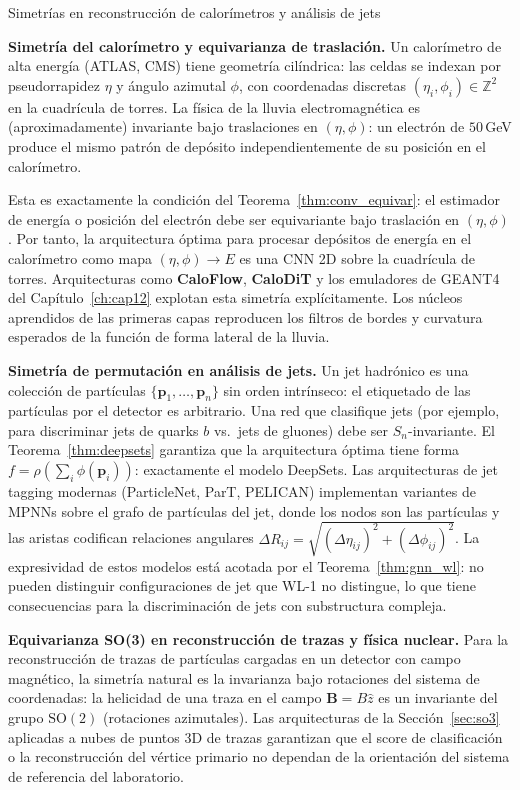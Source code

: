 \label{sec:estrella9}
\begin{estrella}{Simetrías en reconstrucción de calorímetros y análisis de jets}

\textbf{Simetría del calorímetro y equivarianza de traslación.}
Un calorímetro de alta energía (ATLAS, CMS) tiene geometría cilíndrica:
las celdas se indexan por pseudorrapidez $\eta$ y ángulo azimutal $\phi$, con
coordenadas discretas $(\eta_i, \phi_i) \in \mathbb{Z}^2$ en la cuadrícula de
torres. La física de la lluvia electromagnética es (aproximadamente) invariante
bajo traslaciones en $(\eta, \phi)$: un electrón de $50\,$GeV produce el mismo
patrón de depósito independientemente de su posición en el calorímetro.

Esta es exactamente la condición del Teorema~\ref{thm:conv_equivar}: el
estimador de energía o posición del electrón debe ser equivariante bajo
traslación en $(\eta, \phi)$. Por tanto, la arquitectura óptima para procesar
depósitos de energía en el calorímetro como mapa $(\eta, \phi) \to E$ es una
CNN 2D sobre la cuadrícula de torres. Arquitecturas como \textbf{CaloFlow},
\textbf{CaloDiT} y los emuladores de GEANT4 del Capítulo~\ref{ch:cap12}
explotan esta simetría explícitamente. Los núcleos aprendidos de las primeras
capas reproducen los filtros de bordes y curvatura esperados de la función de
forma lateral de la lluvia.

\textbf{Simetría de permutación en análisis de jets.}
Un jet hadrónico es una colección de partículas $\{\bm{p}_1, \ldots, \bm{p}_n\}$
sin orden intrínseco: el etiquetado de las partículas por el detector es
arbitrario. Una red que clasifique jets (por ejemplo, para discriminar jets de
quarks $b$ vs.\ jets de gluones) debe ser $S_n$-invariante. El
Teorema~\ref{thm:deepsets} garantiza que la arquitectura óptima tiene forma
$f = \rho(\sum_i \phi(\bm{p}_i))$: exactamente el modelo DeepSets. Las
arquitecturas de jet tagging modernas (ParticleNet, ParT, PELICAN) implementan
variantes de MPNNs sobre el grafo de partículas del jet, donde los nodos son
las partículas y las aristas codifican relaciones angulares $\Delta R_{ij} =
\sqrt{(\Delta\eta_{ij})^2 + (\Delta\phi_{ij})^2}$. La expresividad de estos
modelos está acotada por el Teorema~\ref{thm:gnn_wl}: no pueden distinguir
configuraciones de jet que WL-1 no distingue, lo que tiene consecuencias
para la discriminación de jets con substructura compleja.

\textbf{Equivarianza SO(3) en reconstrucción de trazas y física nuclear.}
Para la reconstrucción de trazas de partículas cargadas en un detector con campo
magnético, la simetría natural es la invarianza bajo rotaciones del sistema de
coordenadas: la helicidad de una traza en el campo $\bm{B} = B\hat{z}$ es un
invariante del grupo $\mathrm{SO}(2)$ (rotaciones azimutales). Las arquitecturas
de la Sección~\ref{sec:so3} aplicadas a nubes de puntos 3D de trazas garantizan
que el score de clasificación o la reconstrucción del vértice primario no
dependan de la orientación del sistema de referencia del laboratorio.


\end{estrella}
